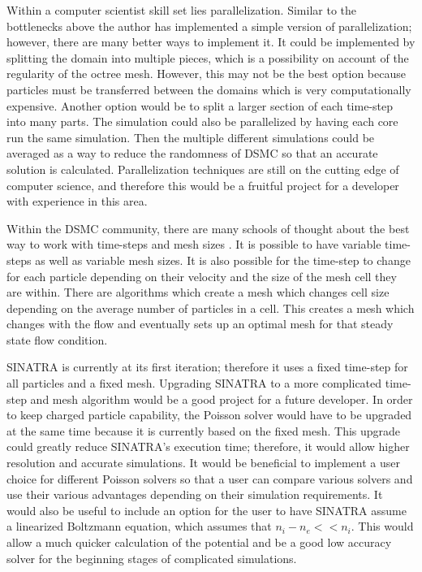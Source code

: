 \indent Within a computer scientist skill set lies parallelization. Similar to the bottlenecks above the author has implemented a simple version of parallelization; however, there are many better ways to implement it. It could be implemented by splitting the domain into multiple pieces, which is a possibility on account of the regularity of the octree mesh. However, this may not be the best option because particles must be transferred between the domains which is very computationally expensive. Another option would be to split a larger section of each time-step into many parts. The simulation could also be parallelized by having each core run the same simulation. Then the multiple different simulations could be averaged as a way to reduce the randomness of DSMC so that an accurate solution is calculated. Parallelization techniques are still on the cutting edge of computer science, and therefore this would be a fruitful project for a developer with experience in this area. \par

\indent Within the DSMC community, there are many schools of thought about the best way to work with time-steps and mesh sizes \cite{bird_dsmc}. It is possible to have variable time-steps as well as variable mesh sizes. It is also possible for the time-step to change for each particle depending on their velocity and the size of the mesh cell they are within. There are algorithms which create a mesh which changes cell size depending on the average number of particles in a cell. This creates a mesh which changes with the flow and eventually sets up an optimal mesh for that steady state flow condition. \par

\indent SINATRA is currently at its first iteration; therefore it uses a fixed time-step for all particles and a fixed mesh. Upgrading SINATRA to a more complicated time-step and mesh algorithm would be a good project for a future developer. In order to keep charged particle capability, the Poisson solver would have to be upgraded at the same time because it is currently based on the fixed mesh. This upgrade could greatly reduce SINATRA's execution time; therefore, it would allow higher resolution and accurate simulations. It would be beneficial to implement a user choice for different Poisson solvers so that a user can compare various solvers and use their various advantages depending on their simulation requirements. It would also be useful to include an option for the user to have SINATRA assume a linearized Boltzmann equation, which assumes that \(n_i-n_e << n_i\). This would allow a much quicker calculation of the potential and be a good low accuracy solver for the beginning stages of complicated simulations.  \par

